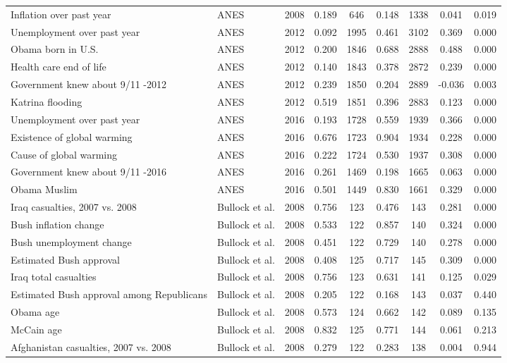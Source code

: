 \begin{longtable}{lllcccccc}
  Inflation over past year & ANES & 2008 & 0.189 &  646 & 0.148 & 1338 & 0.041 & 0.019 \\ 
  Unemployment over past year & ANES & 2012 & 0.092 & 1995 & 0.461 & 3102 & 0.369 & 0.000 \\ 
  Obama born in U.S. & ANES & 2012 & 0.200 & 1846 & 0.688 & 2888 & 0.488 & 0.000 \\ 
  Health care end of life & ANES & 2012 & 0.140 & 1843 & 0.378 & 2872 & 0.239 & 0.000 \\ 
  Government knew about 9/11 -2012 & ANES & 2012 & 0.239 & 1850 & 0.204 & 2889 & -0.036 & 0.003 \\ 
  Katrina flooding & ANES & 2012 & 0.519 & 1851 & 0.396 & 2883 & 0.123 & 0.000 \\ 
  Unemployment over past year & ANES & 2016 & 0.193 & 1728 & 0.559 & 1939 & 0.366 & 0.000 \\ 
  Existence of global warming & ANES & 2016 & 0.676 & 1723 & 0.904 & 1934 & 0.228 & 0.000 \\ 
  Cause of global warming & ANES & 2016 & 0.222 & 1724 & 0.530 & 1937 & 0.308 & 0.000 \\ 
  Government knew about 9/11 -2016 & ANES & 2016 & 0.261 & 1469 & 0.198 & 1665 & 0.063 & 0.000 \\ 
  Obama Muslim & ANES & 2016 & 0.501 & 1449 & 0.830 & 1661 & 0.329 & 0.000 \\ 
  Iraq casualties, 2007 vs. 2008 & Bullock et al. & 2008 & 0.756 &  123 & 0.476 &  143 & 0.281 & 0.000 \\ 
  Bush inflation change & Bullock et al. & 2008 & 0.533 &  122 & 0.857 &  140 & 0.324 & 0.000 \\ 
  Bush unemployment change & Bullock et al. & 2008 & 0.451 &  122 & 0.729 &  140 & 0.278 & 0.000 \\ 
  Estimated Bush approval & Bullock et al. & 2008 & 0.408 &  125 & 0.717 &  145 & 0.309 & 0.000 \\ 
  Iraq total casualties & Bullock et al. & 2008 & 0.756 &  123 & 0.631 &  141 & 0.125 & 0.029 \\ 
  Estimated Bush approval among Republicans & Bullock et al. & 2008 & 0.205 &  122 & 0.168 &  143 & 0.037 & 0.440 \\ 
  Obama age & Bullock et al. & 2008 & 0.573 &  124 & 0.662 &  142 & 0.089 & 0.135 \\ 
  McCain age & Bullock et al. & 2008 & 0.832 &  125 & 0.771 &  144 & 0.061 & 0.213 \\ 
  Afghanistan casualties, 2007 vs. 2008 & Bullock et al. & 2008 & 0.279 &  122 & 0.283 &  138 & 0.004 & 0.944 \\ 

\end{longtable}
